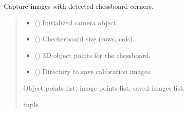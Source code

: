 \documentclass[letterpaper,10pt,english]{sphinxmanual}
\begin{document}
\begin{fulllineitems}
\label{\detokenize{PoseEstimator:PoseEstimator.camera_calibrator.capture_chessboard_images}}
\pysigstartsignatures
{}
\pysigstopsignatures
\sphinxAtStartPar
Capture images with detected chessboard corners.
\begin{quote}\begin{description}
\begin{itemize}
\item {} 
\sphinxAtStartPar
{} () \textendash{} Initialized camera object.

\item {} 
\sphinxAtStartPar
{} () \textendash{} Checkerboard size (rows, cols).

\item {} 
\sphinxAtStartPar
{} () \textendash{} 3D object points for the chessboard.

\item {} 
\sphinxAtStartPar
{} () \textendash{} Directory to save calibration images.

\end{itemize}

\sphinxAtStartPar
Object points list, image points list, saved images list.

\sphinxAtStartPar
tuple

\end{description}\end{quote}

\end{fulllineitems}

\end{document}
